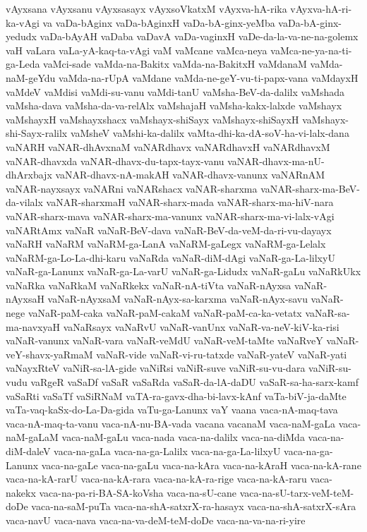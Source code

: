 {vAyxsana
vAyxsanu
vAyxsasayx
vAyxsoVkatxM
vAyxva-hA-rika
vAyxva-hA-ri-ka-vAgi
va
vaDa-bAginx
vaDa-bAginxH
vaDa-bA-ginx-yeMba
vaDa-bA-ginx-yedudx
vaDa-bAyAH
vaDaba
vaDavA
vaDa-vaginxH
vaDe-da-la-va-ne-na-golemx
vaH
vaLara
vaLa-yA-kaq-ta-vAgi
vaM
vaMcane
vaMca-neya
vaMca-ne-ya-na-ti-ga-Leda
vaMci-sade
vaMda-na-Bakitx
vaMda-na-BakitxH
vaMdanaM
vaMda-naM-geYdu
vaMda-na-rUpA
vaMdane
vaMda-ne-geY-vu-ti-papx-vana
vaMdayxH
vaMdeV
vaMdisi
vaMdi-su-vanu
vaMdi-tanU
vaMsha-BeV-da-dalilx
vaMshada
vaMsha-dava
vaMsha-da-va-relAlx
vaMshajaH
vaMsha-kakx-lalxde
vaMshayx
vaMshayxH
vaMshayxshacx
vaMshayx-shiSayx
vaMshayx-shiSayxH
vaMshayx-shi-Sayx-ralilx
vaMsheV
vaMshi-ka-dalilx
vaMta-dhi-ka-dA-soV-ha-vi-lalx-dana
vaNARH
vaNAR-dhAvxnaM
vaNARdhavx
vaNARdhavxH
vaNARdhavxM
vaNAR-dhavxda
vaNAR-dhavx-du-tapx-tayx-vanu
vaNAR-dhavx-ma-nU-dhArxbajx
vaNAR-dhavx-nA-makAH
vaNAR-dhavx-vanunx
vaNARnAM
vaNAR-nayxsayx
vaNARni
vaNARshacx
vaNAR-sharxma
vaNAR-sharx-ma-BeV-da-vilalx
vaNAR-sharxmaH
vaNAR-sharx-mada
vaNAR-sharx-ma-hiV-nara
vaNAR-sharx-mava
vaNAR-sharx-ma-vanunx
vaNAR-sharx-ma-vi-lalx-vAgi
vaNARtAmx
vaNaR
vaNaR-BeV-dava
vaNaR-BeV-da-veM-da-ri-vu-dayayx
vaNaRH
vaNaRM
vaNaRM-ga-LanA
vaNaRM-gaLegx
vaNaRM-ga-Lelalx
vaNaRM-ga-Lo-La-dhi-karu
vaNaRda
vaNaR-diM-dAgi
vaNaR-ga-La-lilxyU
vaNaR-ga-Lanunx
vaNaR-ga-La-varU
vaNaR-ga-Lidudx
vaNaR-gaLu
vaNaRkUkx
vaNaRka
vaNaRkaM
vaNaRkekx
vaNaR-nA-tiVta
vaNaR-nAyxsa
vaNaR-nAyxsaH
vaNaR-nAyxsaM
vaNaR-nAyx-sa-karxma
vaNaR-nAyx-savu
vaNaR-nege
vaNaR-paM-caka
vaNaR-paM-cakaM
vaNaR-paM-ca-ka-vetatx
vaNaR-sa-ma-navxyaH
vaNaRsayx
vaNaRvU
vaNaR-vanUnx
vaNaR-va-neV-kiV-ka-risi
vaNaR-vanunx
vaNaR-vara
vaNaR-veMdU
vaNaR-veM-taMte
vaNaRveY
vaNaR-veY-shavx-yaRmaM
vaNaR-vide
vaNaR-vi-ru-tatxde
vaNaR-yateV
vaNaR-yati
vaNayxRteV
vaNiR-sa-lA-gide
vaNiRsi
vaNiR-suve
vaNiR-su-vu-dara
vaNiR-su-vudu
vaRgeR
vaSaDf
vaSaR
vaSaRda
vaSaR-da-lA-daDU
vaSaR-sa-ha-sarx-kamf
vaSaRti
vaSaTf
vaSiRNaM
vaTA-ra-gavx-dha-bi-lavx-kAnf
vaTa-biV-ja-daMte
vaTa-vaq-kaSx-do-La-Da-gida
vaTu-ga-Lanunx
vaY
vaana
vaca-nA-maq-tava
vaca-nA-maq-ta-vanu
vaca-nA-nu-BA-vada
vacana
vacanaM
vaca-naM-gaLa
vaca-naM-gaLaM
vaca-naM-gaLu
vaca-nada
vaca-na-dalilx
vaca-na-diMda
vaca-na-diM-daleV
vaca-na-gaLa
vaca-na-ga-Lalilx
vaca-na-ga-La-lilxyU
vaca-na-ga-Lanunx
vaca-na-gaLe
vaca-na-gaLu
vaca-na-kAra
vaca-na-kAraH
vaca-na-kA-rane
vaca-na-kA-rarU
vaca-na-kA-rara
vaca-na-kA-ra-rige
vaca-na-kA-raru
vaca-nakekx
vaca-na-pa-ri-BA-SA-koVsha
vaca-na-sU-cane
vaca-na-sU-tarx-veM-teM-doDe
vaca-na-saM-puTa
vaca-na-shA-satxrX-ra-hasayx
vaca-na-shA-satxrX-sAra
vaca-navU
vaca-nava
vaca-na-va-deM-teM-doDe
vaca-na-va-na-ri-yire
}
